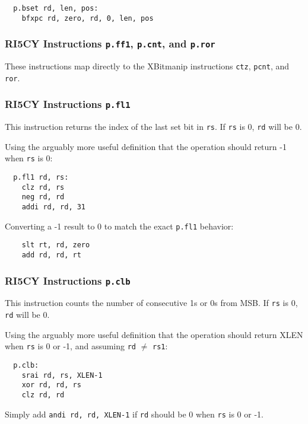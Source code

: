 \begin{verbatim}
  p.bset rd, len, pos:
    bfxpc rd, zero, rd, 0, len, pos
\end{verbatim}

\subsubsection{RI5CY Instructions {\tt p.ff1}, {\tt p.cnt}, and {\tt p.ror}}

These instructions map directly to the XBitmanip instructions {\tt ctz}, {\tt pcnt}, and {\tt ror}.

\subsubsection{RI5CY Instructions {\tt p.fl1}}

This instruction returns the index of the last set bit in {\tt rs}. If {\tt rs} is 0, {\tt rd} will be 0.

Using the arguably more useful definition that the operation should return -1 when {\tt rs} is 0:

\begin{verbatim}
  p.fl1 rd, rs:
    clz rd, rs
    neg rd, rd
    addi rd, rd, 31
\end{verbatim}

Converting a -1 result to 0 to match the exact {\tt p.fl1} behavior:

\begin{verbatim}
    slt rt, rd, zero
    add rd, rd, rt
\end{verbatim}

\subsubsection{RI5CY Instructions {\tt p.clb}}

This instruction counts the number of consecutive 1s or 0s from MSB. If {\tt rs} is 0, {\tt rd} will be 0.

Using the arguably more useful definition that the operation should return XLEN when {\tt rs} is 0 or -1,
and assuming {\tt rd} $\ne$ {\tt rs1}:

\begin{verbatim}
  p.clb:
    srai rd, rs, XLEN-1
    xor rd, rd, rs
    clz rd, rd
\end{verbatim}

Simply add {\tt andi rd, rd, XLEN-1} if {\tt rd} should be 0 when {\tt rs} is 0 or -1.

